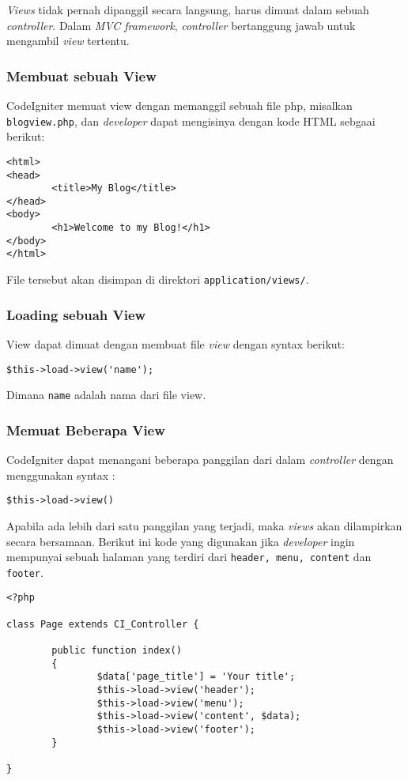 \textit{Views} tidak pernah dipanggil secara langsung, harus dimuat dalam sebuah \textit{controller}. Dalam \textit{MVC framework}, \textit{controller} bertanggung jawab untuk mengambil \textit{view} tertentu. 

\subsubsection{Membuat sebuah View}
CodeIgniter memuat view dengan memanggil sebuah file php, misalkan \verb|blogview.php|, dan \textit{developer} dapat mengisinya dengan kode HTML sebgaai berikut:
\begin{lstlisting}[frame=single] 
<html>
<head>
        <title>My Blog</title>
</head>
<body>
        <h1>Welcome to my Blog!</h1>
</body>
</html>
\end{lstlisting}

File tersebut akan disimpan di direktori \texttt{application/views/}.

\subsubsection{Loading sebuah View}


View dapat dimuat dengan membuat file \textit{view} dengan syntax berikut:

\begin{lstlisting}[frame=single] 
$this->load->view('name');
\end{lstlisting}

\noindent Dimana \texttt{name} adalah nama dari file view.

\subsubsection{Memuat Beberapa View}

CodeIgniter dapat menangani beberapa panggilan dari dalam \textit{controller} dengan menggunakan syntax : 

\begin{lstlisting}[frame=single] 
$this->load->view()
\end{lstlisting}

Apabila ada lebih dari satu panggilan yang terjadi, maka \textit{views} akan dilampirkan secara bersamaan. Berikut ini kode yang digunakan jika \textit{developer} ingin mempunyai sebuah halaman yang terdiri dari \texttt{header, menu, content} dan \texttt{footer}. 


\begin{lstlisting}[frame=single] 
<?php

class Page extends CI_Controller {

        public function index()
        {
                $data['page_title'] = 'Your title';
                $this->load->view('header');
                $this->load->view('menu');
                $this->load->view('content', $data);
                $this->load->view('footer');
        }

}
\end{lstlisting}

